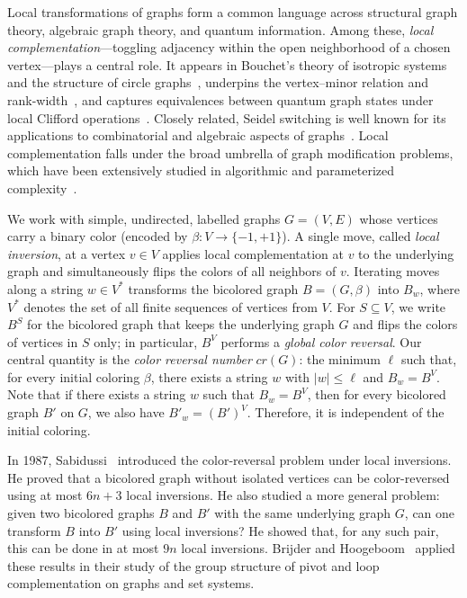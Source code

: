 \documentclass[runningheads,orivec]{llncs}
\begin{document}
Local transformations of graphs form a common language across structural graph theory, algebraic graph theory, and quantum information. Among these, \emph{local complementation}---toggling adjacency within the open neighborhood of a chosen vertex—plays a central role. It appears in Bouchet’s theory of isotropic systems and the structure of circle graphs~\cite{DBLP:journals/jct/Bouchet88,DBLP:journals/jct/Bouchet94}, underpins the vertex–minor relation and rank-width~\cite{DBLP:journals/jct/Oum05}, and captures equivalences between quantum graph states under local Clifford operations~\cite{hein2004multiparty,van2004graphical}. Closely related, Seidel switching is well known for its applications to combinatorial and algebraic aspects of graphs~\cite{seidel1991survey}. Local complementation falls under the broad umbrella of graph modification problems, which have been extensively studied in algorithmic and parameterized complexity~\cite{DBLP:journals/dagstuhl-reports/BodlaenderHL14,DBLP:journals/ipl/Cai96,crespelle2023survey}.

We work with simple, undirected, labelled graphs $G=(V,E)$ whose vertices carry a binary color (encoded by $\beta:V\to\{-1,+1\}$). A single move, called \emph{local inversion}, at a vertex $v\in V$ applies local complementation at $v$ to the underlying graph and simultaneously flips the colors of all neighbors of $v$. Iterating moves along a string $w\in V^*$ transforms the bicolored graph $B=(G,\beta)$ into $B_w$, where $V^*$ denotes the set of all finite sequences of vertices from $V$. For $S\subseteq V$, we write $B^S$ for the bicolored graph that keeps the underlying graph $G$ and flips the colors of vertices in $S$ only; in particular, $B^{V}$ performs a \emph{global color reversal}. Our central quantity is the \emph{color reversal number} $cr(G)$: the minimum $\ell$ such that, for every initial coloring $\beta$, there exists a string $w$ with $|w|\le \ell$ and $B_w=B^{V}$. Note that if there exists a string $w$ such that $B_w = B^V$, then for every bicolored graph $B'$ on $G$, we also have $B'_w = (B')^V$. Therefore, it is independent of the initial coloring.

In 1987, Sabidussi~\cite{sabidussi1987color} introduced the color-reversal problem under local inversions. He proved that a bicolored graph without isolated vertices can be color-reversed using at most $6n+3$ local inversions. He also studied a more general problem: given two bicolored graphs $B$ and $B'$ with the same underlying graph $G$, can one transform $B$ into $B'$ using local inversions? He showed that, for any such pair, this can be done in at most $9n$ local inversions. Brijder and Hoogeboom~\cite{brijder2011group} applied these results in their study of the group structure of pivot and loop complementation on graphs and set systems.
\end{document}
